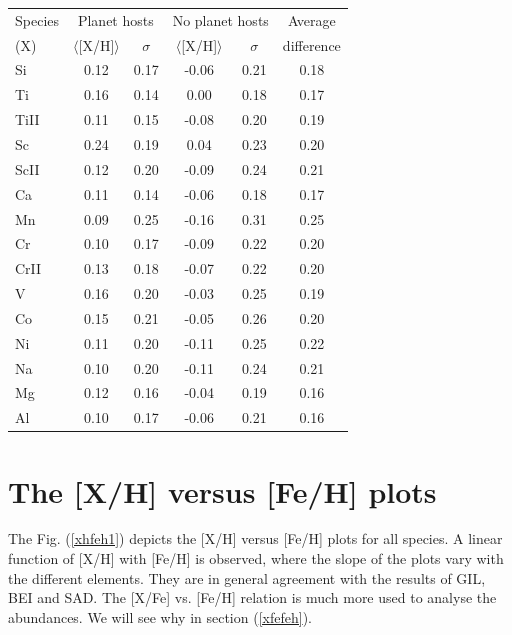 \documentclass[dvips,12pt,a4paper]{report}
\begin{document}
{{\begin{table}[h]
\begin{tabular}{ l c c c c c}
\hline
\hline 
Species & \multicolumn {2}{c}{Planet hosts} & \multicolumn {2}{c}{No planet hosts} & Average  \\
(X) & $\langle$[X/H]$\rangle$ & $\sigma$ & $\langle$[X/H]$\rangle$ & $\sigma$ & difference \\
\hline
          Si & 0.12 & 0.17 & -0.06 & 0.21 & 0.18 \\
          Ti & 0.16 & 0.14 & 0.00 & 0.18 & 0.17 \\
        TiII & 0.11 & 0.15 & -0.08 & 0.20 & 0.19\\
          Sc & 0.24 & 0.19 & 0.04 & 0.23 & 0.20\\
        ScII & 0.12 & 0.20 & -0.09 & 0.24 & 0.21\\
          Ca & 0.11 & 0.14 & -0.06 & 0.18 & 0.17\\
          Mn & 0.09 & 0.25 & -0.16 & 0.31 & 0.25\\
          Cr & 0.10 & 0.17 & -0.09 & 0.22 & 0.20\\
        CrII & 0.13 & 0.18 & -0.07 & 0.22 & 0.20\\
           V & 0.16 & 0.20 & -0.03 & 0.25 & 0.19\\
          Co & 0.15 & 0.21 & -0.05 & 0.26 & 0.20\\
          Ni & 0.11 & 0.20 & -0.11 & 0.25 & 0.22\\
          Na & 0.10 & 0.20 & -0.11 & 0.24 & 0.21\\
          Mg & 0.12 & 0.16 & -0.04 & 0.19 & 0.16\\
          Al & 0.10 & 0.17 & -0.06 & 0.21 & 0.16\\
\hline

\end{tabular}
\end{table}



\section{The [X/H] versus [Fe/H] plots}
\label{xhfeh}
The Fig. (\ref{xhfeh1}) depicts the [X/H] versus [Fe/H] plots for all species. A linear function of [X/H] with [Fe/H] is observed, where the slope of the plots vary with the different elements. They are in general agreement with the results of GIL, BEI and SAD. The [X/Fe] vs. [Fe/H] relation is much more used to analyse the abundances. We will see why in section (\ref{xfefeh}). 

}}
\end{document}
